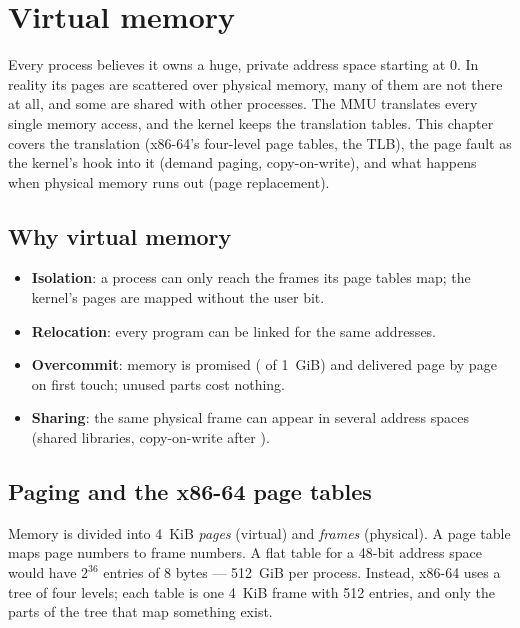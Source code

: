 \chapter{Virtual memory}
\label{ch:vm}

Every process believes it owns a huge, private address space starting at
0. In reality its pages are scattered over physical memory, many of them
are not there at all, and some are shared with other processes. The MMU
translates every single memory access, and the kernel keeps the
translation tables. This chapter covers the translation (x86-64's
four-level page tables, the TLB), the page fault as the kernel's hook
into it (demand paging, copy-on-write), and what happens when physical
memory runs out (page replacement).

\section{Why virtual memory}

\begin{itemize}
  \item \textbf{Isolation}: a process can only reach the frames its page
    tables map; the kernel's pages are mapped without the user bit.
  \item \textbf{Relocation}: every program can be linked for the same
    addresses.
  \item \textbf{Overcommit}: memory is promised ( of 1~GiB) and
    delivered page by page on first touch; unused parts cost nothing.
  \item \textbf{Sharing}: the same physical frame can appear in several
    address spaces (shared libraries, copy-on-write after ).
\end{itemize}

\section{Paging and the x86-64 page tables}

Memory is divided into 4~KiB \emph{pages} (virtual) and \emph{frames}
(physical). A page table maps page numbers to frame numbers. A flat table
for a 48-bit address space would have $2^{36}$ entries of 8 bytes ---
512~GiB per process. Instead, x86-64 uses a tree of four levels; each
table is one 4~KiB frame with 512 entries, and only the parts of the tree
that map something exist.

